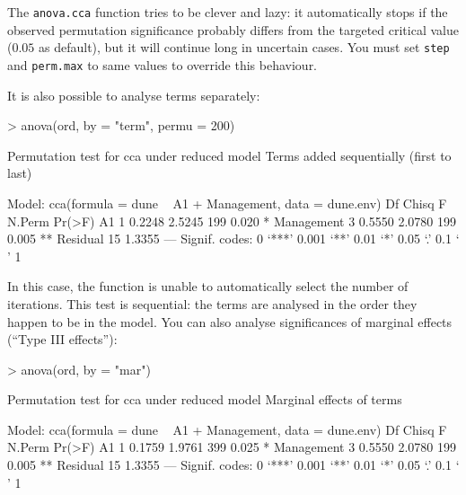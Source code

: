 \documentclass[a4paper,10pt]{amsart}
\begin{document}
The \texttt{anova.cca} function tries to be clever and lazy: it
automatically stops if the observed permutation significance probably
differs from the targeted critical value ($0.05$ as default), but it
will continue long in uncertain cases.  You must set \texttt{step} and
\texttt{perm.max} to same values to override this behaviour.

It is also possible to analyse terms separately:
\begin{Schunk}
\begin{Sinput}
> anova(ord, by = "term", permu = 200)
\end{Sinput}
\begin{Soutput}
Permutation test for cca under reduced model
Terms added sequentially (first to last)

Model: cca(formula = dune ~ A1 + Management, data = dune.env)
           Df  Chisq      F N.Perm Pr(>F)   
A1          1 0.2248 2.5245    199  0.020 * 
Management  3 0.5550 2.0780    199  0.005 **
Residual   15 1.3355                        
---
Signif. codes:  0 ‘***’ 0.001 ‘**’ 0.01 ‘*’ 0.05 ‘.’ 0.1 ‘ ’ 1 
\end{Soutput}
\end{Schunk}
In this case, the function is unable to automatically select the
number of iterations. This test is sequential: the terms are analysed
in the order they happen to be in the model. You can also analyse
significances of marginal effects (``Type III effects''):
\begin{Schunk}
\begin{Sinput}
> anova(ord, by = "mar")
\end{Sinput}
\begin{Soutput}
Permutation test for cca under reduced model
Marginal effects of terms

Model: cca(formula = dune ~ A1 + Management, data = dune.env)
           Df  Chisq      F N.Perm Pr(>F)   
A1          1 0.1759 1.9761    399  0.025 * 
Management  3 0.5550 2.0780    199  0.005 **
Residual   15 1.3355                        
---
Signif. codes:  0 ‘***’ 0.001 ‘**’ 0.01 ‘*’ 0.05 ‘.’ 0.1 ‘ ’ 1 
\end{Soutput}
\end{Schunk}
\end{document}
